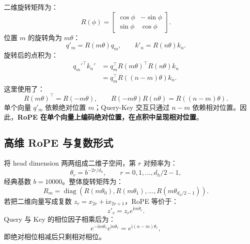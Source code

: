 \documentclass[UTF8,fontset=none,a4paper,10pt]{ctexart}
\newcommand{\term}[1]{\textbf{#1}}
\begin{document}
二维旋转矩阵为：
\begin{equation}
  R(\phi)=
  \begin{bmatrix}
    \cos\phi&-\sin\phi\\
    \sin\phi&\cos\phi
  \end{bmatrix}.
  \label{zh:eq:rotation}
\end{equation}
位置 $m$ 的旋转角为 $m\theta$：
\begin{equation}
  q'_m=R(m\theta)q_m,\qquad k'_n=R(n\theta)k_n.
  \label{zh:eq:rope-rotate}
\end{equation}
旋转后的点积为：
\begin{equation}
  \begin{aligned}
  q_m'^\top k_n'
  &=q_m^\top R(m\theta)^\top R(n\theta)k_n\\
  &=q_m^\top R((n-m)\theta)k_n.
  \end{aligned}
  \label{zh:eq:rope-core}
\end{equation}
这里使用了：
\begin{equation}
  R(m\theta)^\top=R(-m\theta),\qquad
  R(-m\theta)R(n\theta)=R((n-m)\theta).
  \label{zh:eq:rotation-group}
\end{equation}
单个向量 $q'_m$ 依赖绝对位置 $m$；Query-Key 交互只通过 $n-m$ 依赖相对位置。因此，\term{RoPE 在单个向量上编码绝对位置，在点积中呈现相对位置}。

\subsection{高维 RoPE 与复数形式}

将 head dimension 两两组成二维子空间，第 $r$ 对频率为：
\begin{equation}
  \theta_r=b^{-2r/d_h},\qquad r=0,1,\ldots,d_h/2-1,
  \label{zh:eq:rope-frequency}
\end{equation}
经典基数 $b=10000$。整体旋转矩阵为：
\begin{equation}
  R_m=\operatorname{diag}\left(
  R(m\theta_0),R(m\theta_1),\ldots,R(m\theta_{d_h/2-1})
  \right).
  \label{zh:eq:rope-block}
\end{equation}
若把二维向量写成复数 $z_r=x_{2r}+\mathrm{i}x_{2r+1}$，RoPE 等价于：
\begin{equation}
  z'_r=z_r e^{\mathrm{i}m\theta_r}.
  \label{zh:eq:rope-complex}
\end{equation}
Query 与 Key 的相位因子相乘后为：
\begin{equation}
  e^{-\mathrm{i}m\theta_r}e^{\mathrm{i}n\theta_r}
  =e^{\mathrm{i}(n-m)\theta_r},
  \label{zh:eq:rope-relative-phase}
\end{equation}
即绝对相位相减后只剩相对相位。
\end{document}
